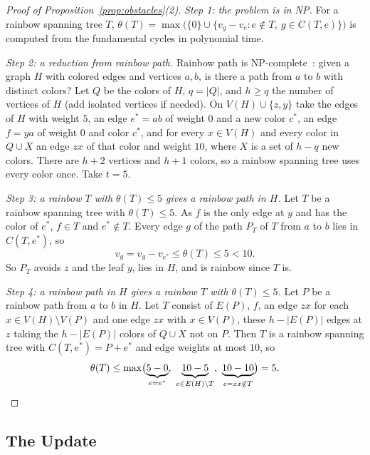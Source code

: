 \begin{proof}[Proof of Proposition~\ref{prop:obstacles}(2)]
\emph{Step 1: the problem is in NP.}  For a rainbow spanning tree $T$,
$\theta(T)=\max\bigl(\{0\}\cup\{v_g-v_e:e\notin T,\ g\in C(T,e)\}\bigr)$ is
computed from the fundamental cycles in polynomial time.

\emph{Step 2: a reduction from rainbow path.}  Rainbow path is NP-complete~\cite{cfmy09}: given a graph $H$ with colored edges and vertices $a,b$, is there a
path from $a$ to $b$ with distinct colors?  Let $Q$ be the colors of $H$,
$q=|Q|$, and $h\ge q$ the number of vertices of $H$ (add isolated vertices if
needed).  On $V(H)\cup\{z,y\}$ take the edges of $H$ with weight $5$, an edge
$e^{*}=ab$ of weight $0$ and a new color $c^{*}$, an edge $f=ya$ of weight $0$ and
color $c^{*}$, and for every $x\in V(H)$ and every color in $Q\cup X$ an edge $zx$
of that color and weight $10$, where $X$ is a set of $h-q$ new colors.  There are $h+2$ vertices and $h+1$ colors, so a
rainbow spanning tree uses every color once.  Take $t=5$.

\emph{Step 3: a rainbow $T$ with $\theta(T)\le5$ gives a rainbow path in $H$.}  Let $T$ be a rainbow spanning tree with
$\theta(T)\le5$.  As $f$ is the only edge at $y$ and has the color of $e^{*}$,
$f\in T$ and $e^{*}\notin T$.  Every edge $g$ of the path $P_T$ of $T$ from $a$
to $b$ lies in $C(T,e^{*})$, so
\[
  v_g=v_g-v_{e^{*}}\le\theta(T)\le5<10.
\]
So $P_T$ avoids $z$ and the leaf $y$, lies in $H$, and is rainbow since $T$ is.

\emph{Step 4: a rainbow path in $H$ gives a rainbow $T$ with $\theta(T)\le5$.}  Let $P$ be a rainbow path from $a$ to $b$
in $H$.  Let $T$ consist of $E(P)$, $f$, an edge $zx$ for each
$x\in V(H)\setminus V(P)$ and one edge $zx$ with $x\in V(P)$, these
$h-|E(P)|$ edges at $z$ taking the $h-|E(P)|$ colors of $Q\cup X$ not on $P$.
Then $T$ is a rainbow spanning tree with $C(T,e^{*})=P+e^{*}$ and edge weights at
most $10$, so
\[
  \theta(T)\le\max\bigl(\underbrace{5-0}_{e=e^{*}},\ \underbrace{10-5}_{e\in E(H)\setminus T},\
  \underbrace{10-10}_{e=zx\notin T}\bigr)=5.\qedhere
\]
\end{proof}

\subsection{The Update}
\label{app:update}

